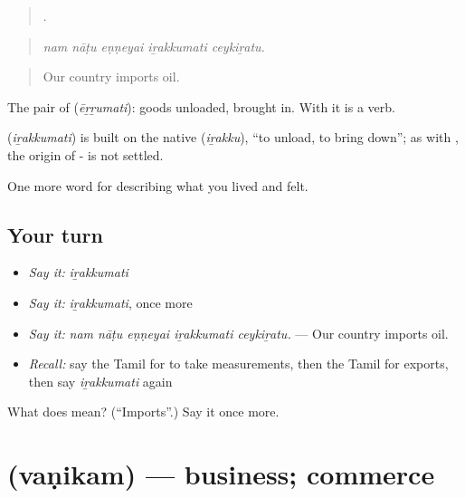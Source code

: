 \begin{quote}
    .
\end{quote}

\begin{quote}
\emph{nam nāṭu eṇṇeyai iṟakkumati ceykiṟatu.}
\end{quote}

\begin{quote}
Our country imports oil.
\end{quote}

The pair of  (\emph{ēṟṟumati}): goods unloaded, brought in. With  it is a verb.

\begin{cousinweb}
\textbf{} (\emph{iṟakkumati}) is built on the native  (\emph{iṟakku}), \textquotedblleft{}to unload, to bring down\textquotedblright{}; as with , the origin of - is not settled.
\end{cousinweb}

\begin{grammarlens}[title={What you've built}]
One more word for describing what you lived and felt.
\end{grammarlens}

\subsection*{Your turn}
\begin{itemize}
\raggedright
  \item \emph{Say it:} \emph{iṟakkumati}
  \item \emph{Say it:} \emph{iṟakkumati}, once more
  \item \emph{Say it:} \emph{nam nāṭu eṇṇeyai iṟakkumati ceykiṟatu.} — Our country imports oil.
  \item \emph{Recall:} say the Tamil for to take measurements, then the Tamil for exports, then say \emph{iṟakkumati} again
\end{itemize}

\begin{tcolorbox}[breakable,colback=teal!4,colframe=teal!35!black,title={Before you move on}]
What does  mean? (\textquotedblleft{}Imports\textquotedblright{}.) Say it once more.
\end{tcolorbox}
\section[\texorpdfstring{\ta{வணிகம்} (vaṇikam)}{வணிகம் (vaṇikam)}]{ (vaṇikam) — business; commerce}

